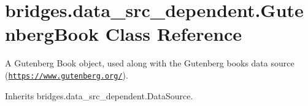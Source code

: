 \hypertarget{classbridges_1_1data__src__dependent_1_1_gutenberg_book}{}\section{bridges.\+data\+\_\+src\+\_\+dependent.\+Gutenberg\+Book Class Reference}
\label{classbridges_1_1data__src__dependent_1_1_gutenberg_book}


A Gutenberg Book object, used along with the Gutenberg books data source (\href{https://www.gutenberg.org/}{\tt https\+://www.\+gutenberg.\+org/}).  




Inherits bridges.\+data\+\_\+src\+\_\+dependent.\+Data\+Source.

